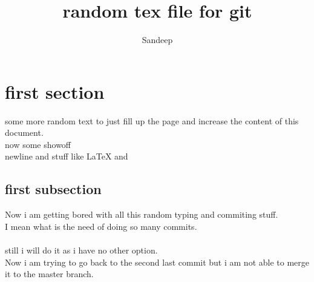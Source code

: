 \documentclass {article}
\author {Sandeep}
\title {random tex file for git}
\begin{document}
\maketitle
\section{first section}
some more random text to just fill up the page and increase the content of this document.\\
now some showoff\cite{sandu} \\
newline and stuff like \LaTeX{} and \cite{sandbook}

\subsection{first subsection}
Now i am getting bored with all this random typing and commiting stuff.\\
I mean what is the need of doing so many commits.\\ \\
still i will do it as i have no other option.
\\
Now i am trying to go back to the second last commit but i am not able to merge it to the master branch.


\end{document}
